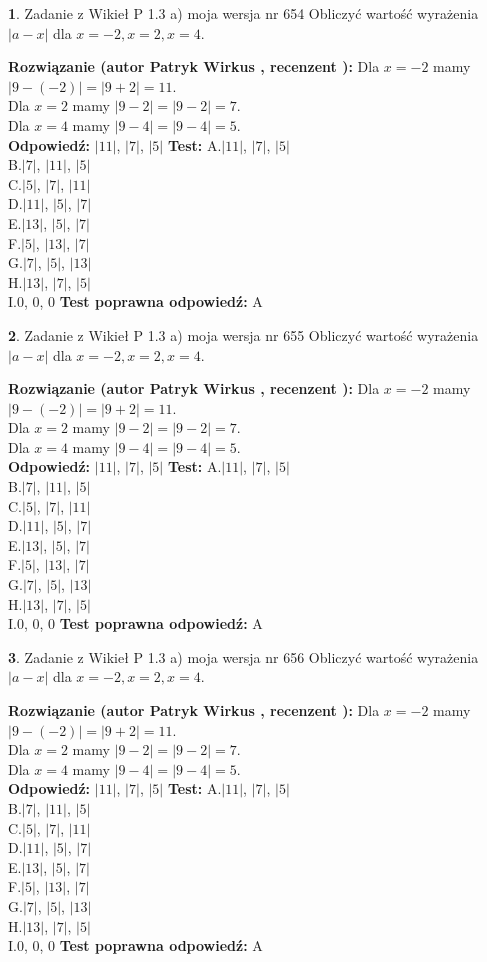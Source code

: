 \documentclass[12pt, a4paper]{article}
\theoremstyle{definition} %
\newtheorem{zad}{}
\newcommand{\zadStart}[1]{\begin{zad}#1\newline}
\newcommand{\zadStop}{\end{zad}}
\newcommand{\rozwStart}[2]{\noindent \textbf{Rozwiązanie (autor #1 , recenzent #2): }\newline}
\newcommand{\rozwStop}{\newline}
\newcommand{\odpStart}{\noindent \textbf{Odpowiedź:}\newline}
\newcommand{\odpStop}{\newline}
\newcommand{\testStart}{\noindent \textbf{Test:}\newline}
\newcommand{\testStop}{\newline}
\newcommand{\kluczStart}{\noindent \textbf{Test poprawna odpowiedź:}\newline}
\newcommand{\kluczStop}{\newline}
\begin{document}
\zadStart{Zadanie z Wikieł P 1.3 a) moja wersja nr 654}
Obliczyć wartość wyrażenia $|a - x|$ dla $x=-2,x=2,x=4$.
\zadStop
\rozwStart{Patryk Wirkus}{}
Dla $x = -2$ mamy $|9 - (-2)| = |9 + 2| = 11$.\\
Dla $x = 2$ mamy $|9 - 2| = |9 - 2| = 7$.\\
Dla $x = 4$ mamy $|9 - 4| = |9 - 4| = 5$.\\
\rozwStop
\odpStart
$|11|$, $|7|$, $|5|$
\odpStop
\testStart
A.$|11|$, $|7|$, $|5|$\\
B.$|7|$, $|11|$, $|5|$\\
C.$|5|$, $|7|$, $|11|$\\
D.$|11|$, $|5|$, $|7|$\\
E.$|13|$, $|5|$, $|7|$\\
F.$|5|$, $|13|$, $|7|$\\
G.$|7|$, $|5|$, $|13|$\\
H.$|13|$, $|7|$, $|5|$\\
I.$0$, $0$, $0$
\testStop
\kluczStart
A
\kluczStop



\zadStart{Zadanie z Wikieł P 1.3 a) moja wersja nr 655}
Obliczyć wartość wyrażenia $|a - x|$ dla $x=-2,x=2,x=4$.
\zadStop
\rozwStart{Patryk Wirkus}{}
Dla $x = -2$ mamy $|9 - (-2)| = |9 + 2| = 11$.\\
Dla $x = 2$ mamy $|9 - 2| = |9 - 2| = 7$.\\
Dla $x = 4$ mamy $|9 - 4| = |9 - 4| = 5$.\\
\rozwStop
\odpStart
$|11|$, $|7|$, $|5|$
\odpStop
\testStart
A.$|11|$, $|7|$, $|5|$\\
B.$|7|$, $|11|$, $|5|$\\
C.$|5|$, $|7|$, $|11|$\\
D.$|11|$, $|5|$, $|7|$\\
E.$|13|$, $|5|$, $|7|$\\
F.$|5|$, $|13|$, $|7|$\\
G.$|7|$, $|5|$, $|13|$\\
H.$|13|$, $|7|$, $|5|$\\
I.$0$, $0$, $0$
\testStop
\kluczStart
A
\kluczStop



\zadStart{Zadanie z Wikieł P 1.3 a) moja wersja nr 656}
Obliczyć wartość wyrażenia $|a - x|$ dla $x=-2,x=2,x=4$.
\zadStop
\rozwStart{Patryk Wirkus}{}
Dla $x = -2$ mamy $|9 - (-2)| = |9 + 2| = 11$.\\
Dla $x = 2$ mamy $|9 - 2| = |9 - 2| = 7$.\\
Dla $x = 4$ mamy $|9 - 4| = |9 - 4| = 5$.\\
\rozwStop
\odpStart
$|11|$, $|7|$, $|5|$
\odpStop
\testStart
A.$|11|$, $|7|$, $|5|$\\
B.$|7|$, $|11|$, $|5|$\\
C.$|5|$, $|7|$, $|11|$\\
D.$|11|$, $|5|$, $|7|$\\
E.$|13|$, $|5|$, $|7|$\\
F.$|5|$, $|13|$, $|7|$\\
G.$|7|$, $|5|$, $|13|$\\
H.$|13|$, $|7|$, $|5|$\\
I.$0$, $0$, $0$
\testStop
\kluczStart
A
\kluczStop
\end{document}
